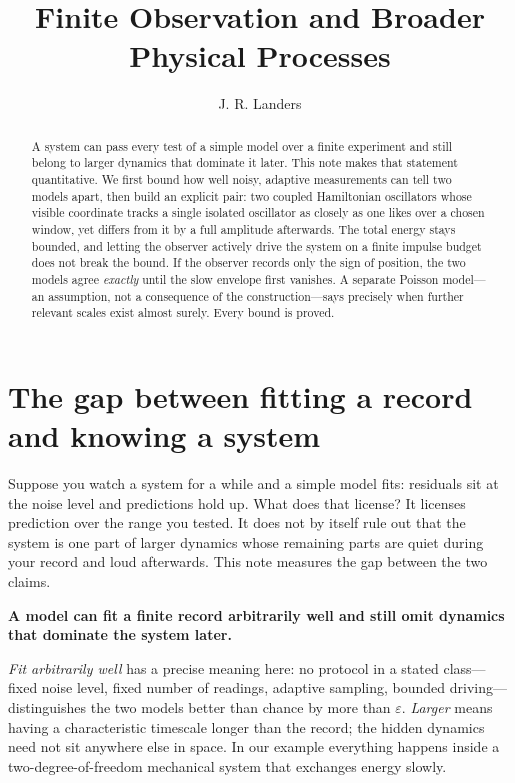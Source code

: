\documentclass[10pt]{article}
\title{\vspace{-2.3em}\textbf{Finite Observation and Broader Physical Processes}}
\author{J. R. Landers}
\date{}
\newcounter{claim}
\newcommand{\eps}{\varepsilon}
\begin{document}
\maketitle
\vspace{-1.35em}
\small
\begin{abstract}
A system can pass every test of a simple model over a finite experiment and
still belong to larger dynamics that dominate it later. This note makes that
statement quantitative. We first bound how well noisy, adaptive measurements
can tell two models apart, then build an explicit pair: two coupled Hamiltonian
oscillators whose visible coordinate tracks a single isolated oscillator as
closely as one likes over a chosen window, yet differs from it by a full
amplitude afterwards. The total energy stays bounded, and letting the observer
actively drive the system on a finite impulse budget does not break the bound.
If the observer records only the sign of position, the two models agree
\emph{exactly} until the slow envelope first vanishes. A separate Poisson
model---an assumption, not a consequence of the construction---says precisely
when further relevant scales exist almost surely. Every bound is proved.
\end{abstract}

\section*{The gap between fitting a record and knowing a system}
Suppose you watch a system for a while and a simple model fits: residuals sit
at the noise level and predictions hold up. What does that license? It licenses
prediction over the range you tested. It does not by itself rule out that the
system is one part of larger dynamics whose remaining parts are quiet during
your record and loud afterwards. This note measures the gap between the two
claims.

\begin{highlightbox}
\centering
\textbf{A model can fit a finite record arbitrarily well and still omit
dynamics that dominate the system later.}
\end{highlightbox}

\emph{Fit arbitrarily well} has a precise meaning here: no protocol in a
stated class---fixed noise level, fixed number of readings, adaptive sampling,
bounded driving---distinguishes the two models better than chance by more than
$\eps$. \emph{Larger} means having a characteristic timescale longer than the
record; the hidden dynamics need not sit anywhere else in space. In our example
everything happens inside a two-degree-of-freedom mechanical system that
exchanges energy slowly.
\end{document}
